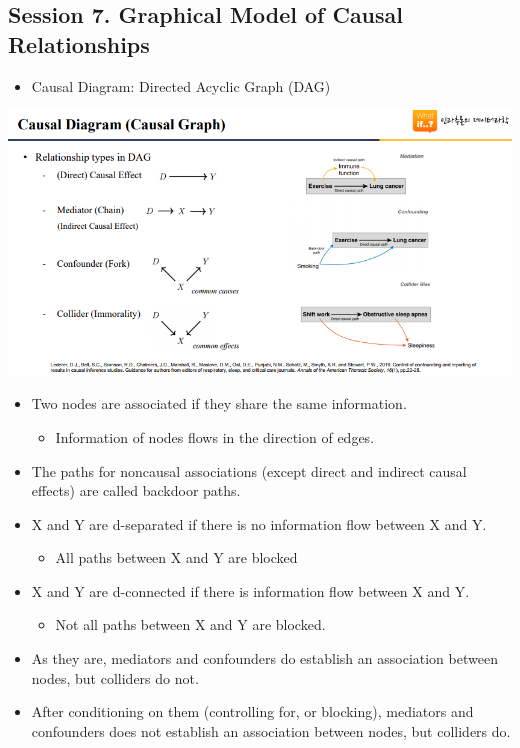 \documentclass[
]{book}
\providecommand{\tightlist}{%
  \setlength{\itemsep}{0pt}\setlength{\parskip}{0pt}}
\theoremstyle{definition}
\theoremstyle{definition}
\theoremstyle{definition}
\theoremstyle{definition}
\theoremstyle{remark}
\begin{document}
\hypertarget{session-7.-graphical-model-of-causal-relationships}{%
\subsection{Session 7. Graphical Model of Causal Relationships}\label{session-7.-graphical-model-of-causal-relationships}}

\begin{itemize}
\tightlist
\item
  Causal Diagram: Directed Acyclic Graph (DAG)
\end{itemize}

\includegraphics{figures/53.png}

\begin{itemize}
\tightlist
\item
  Two nodes are associated if they share the same information.

  \begin{itemize}
  \tightlist
  \item
    Information of nodes flows in the direction of edges.
  \end{itemize}
\item
  The paths for noncausal associations (except direct and indirect causal effects) are called backdoor paths.
\item
  X and Y are d-separated if there is no information flow between X and Y.

  \begin{itemize}
  \tightlist
  \item
    All paths between X and Y are blocked
  \end{itemize}
\item
  X and Y are d-connected if there is information flow between X and Y.

  \begin{itemize}
  \tightlist
  \item
    Not all paths between X and Y are blocked.
  \end{itemize}
\item
  As they are, mediators and confounders do establish an association between nodes, but colliders do not.
\item
  After conditioning on them (controlling for, or blocking), mediators and confounders does not establish an association between nodes, but colliders do.
\end{itemize}
\end{document}

